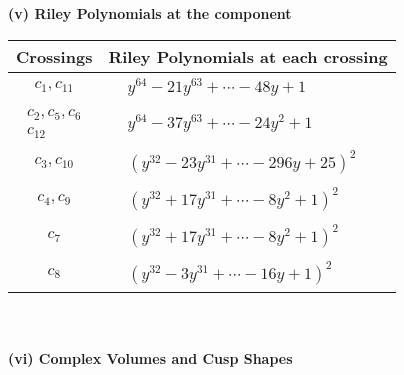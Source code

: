 \documentclass[1p]{elsarticle_modified}
\theoremstyle{definition}
\begin{document}
\newpage\renewcommand{\arraystretch}{1}
\flushleft \textbf{(v) Riley Polynomials at the component}\newline \\
\begin{tabular}{m{50pt}|m{274pt}}
Crossings & \hspace{64pt}Riley Polynomials at each crossing \\
\hline $$\begin{aligned}c_{1},c_{11}\end{aligned}$$&$\begin{aligned}
&y^{64}-21 y^{63}+\cdots-48 y+1
\end{aligned}$\\
\hline $$\begin{aligned}c_{2},c_{5},c_{6}\\c_{12}\end{aligned}$$&$\begin{aligned}
&y^{64}-37 y^{63}+\cdots-24 y^2+1
\end{aligned}$\\
\hline $$\begin{aligned}c_{3},c_{10}\end{aligned}$$&$\begin{aligned}
&(y^{32}-23 y^{31}+\cdots-296 y+25)^{2}
\end{aligned}$\\
\hline $$\begin{aligned}c_{4},c_{9}\end{aligned}$$&$\begin{aligned}
&(y^{32}+17 y^{31}+\cdots-8 y^2+1)^{2}
\end{aligned}$\\
\hline $$\begin{aligned}c_{7}\end{aligned}$$&$\begin{aligned}
&(y^{32}+17 y^{31}+\cdots-8 y^2+1)^{2}
\end{aligned}$\\
\hline $$\begin{aligned}c_{8}\end{aligned}$$&$\begin{aligned}
&(y^{32}-3 y^{31}+\cdots-16 y+1)^{2}
\end{aligned}$\\
\hline
\end{tabular}\\~\\
\newpage\flushleft \textbf{(vi) Complex Volumes and Cusp Shapes}
\end{document}
